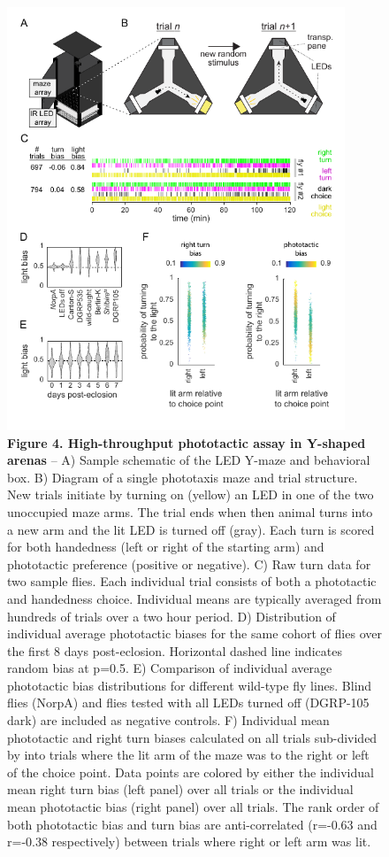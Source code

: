 \documentclass[10pt]{article}
\begin{document}
\newpage
\begin{figure}[h!]
	\begin{center}
		\includegraphics[width=0.9\textwidth]{../figures/LED_ymaze_panel_sm.pdf}
	\end{center}
	\caption*{\footnotesize \textbf{Figure 4. High-throughput phototactic assay in Y-shaped arenas} -- A) Sample schematic of the LED Y-maze and behavioral box. B) Diagram of a single phototaxis maze and trial structure. New trials initiate by turning on (yellow) an LED in one of the two unoccupied maze arms. The trial ends when then animal turns into a new arm and the lit LED is turned off (gray). Each turn is scored for both handedness (left or right of the starting arm) and phototactic preference (positive or negative). C) Raw turn data for two sample flies. Each individual trial consists of both a phototactic and handedness choice. Individual means are typically averaged from hundreds of trials over a two hour period. D) Distribution of individual average phototactic biases for the same cohort of flies over the first 8 days post-eclosion. Horizontal dashed line indicates random bias at p=0.5. E) Comparison of individual average phototactic bias distributions for different wild-type fly lines. Blind flies (NorpA) and flies tested with all LEDs turned off (DGRP-105 dark) are included as negative controls. F) Individual mean phototactic and right turn biases calculated on all trials sub-divided by into trials where the lit arm of the maze was to the right or left of the choice point. Data points are colored by either the individual mean right turn bias (left panel) over all trials or the individual mean phototactic bias (right panel) over all trials. The rank order of both phototactic bias and turn bias are anti-correlated (r=-0.63 and r=-0.38 respectively) between trials where right or left arm was lit.}
\end{figure}
\end{document}
